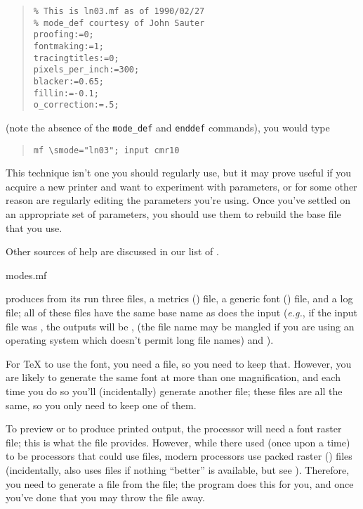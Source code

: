 \begin{quote}
\begin{verbatim}
% This is ln03.mf as of 1990/02/27
% mode_def courtesy of John Sauter
proofing:=0;
fontmaking:=1;
tracingtitles:=0;
pixels_per_inch:=300;
blacker:=0.65;
fillin:=-0.1;
o_correction:=.5;
\end{verbatim}
\end{quote}
(note the absence of the \texttt{mode\_def} and \texttt{enddef}
commands), you would type
\begin{quote}
\begin{verbatim}
mf \smode="ln03"; input cmr10
\end{verbatim}
\end{quote}
This technique isn't one you should regularly use, but it may
prove useful if you acquire a new printer and want to experiment with
parameters, or for some other reason are regularly editing the
parameters you're using.  Once you've settled on an appropriate set of
parameters, you should use them to rebuild the base file that you use.

Other sources of help are discussed in our list of %
.
\begin{ctanrefs}
\item[modes.mf]
\end{ctanrefs}


\MF{} produces from its run three files, a metrics () file, a
generic font () file, and a log file; all of these files have the
same base name as does the input (\emph{e.g.}, if the input file was
, the outputs will be ,
 (the file name may be mangled if you are using an
operating system which doesn't permit long file names)
and ).

For \TeX{} to use the font, you need a  file, so you need
to keep that.  However, you are likely to generate the same font
at more than one magnification, and each time you do so you'll
(incidentally) generate another  file; these files are
all the same, so you only need to keep one of them.

To preview or to produce printed output, the  processor will need a
font raster file; this is what the  file provides.  However, while
there used (once upon a time) to be  processors that could use 
 files, modern processors  use
packed raster () files (incidentally, \pdftex{} also uses
 files if nothing ``better'' is available, but
see ).
Therefore, you need to generate a  file from the  file; the
program  does this for you, and once you've done that you
may throw the  file away.

